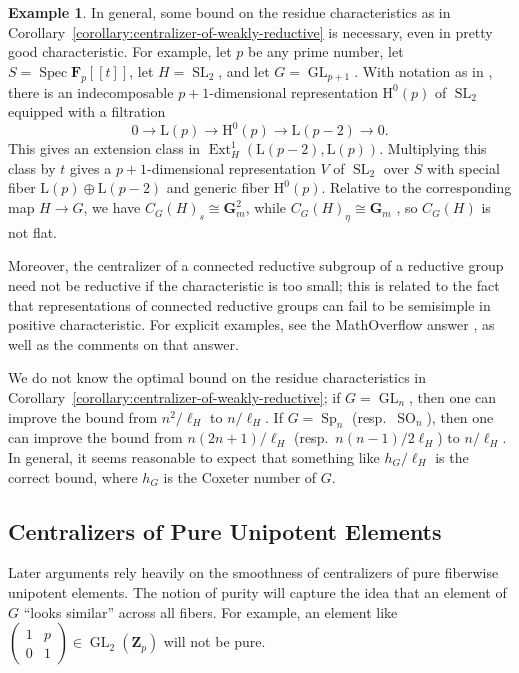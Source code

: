 \documentclass[11pt, letterpaper,english]{amsart}
\theoremstyle{plain}
\theoremstyle{definition}
\newtheorem{example}[lem]{Example}
\numberwithin{equation}{section}
\numberwithin{lem}{section}
\newcommand{\mathfont}{\mathbf}
\newcommand{\Z}{\mathfont Z}
\newcommand{\bF}{\mathfont{F}}
\newcommand{\bG}{\mathfont{G}}
\DeclareMathOperator{\Ext}{Ext}
\newcommand{\ttm}[4]{\begin{pmatrix}
#1 & #2 \\
#3 & #4
\end{pmatrix}}
\DeclareMathOperator{\Spec}{Spec}
\DeclareMathOperator{\GL}{GL}
\DeclareMathOperator{\SL}{SL}
\DeclareMathOperator{\SO}{SO}
\DeclareMathOperator{\Sp}{Sp}
\begin{document}
\begin{example}
In general, some bound on the residue characteristics as in Corollary~\ref{corollary:centralizer-of-weakly-reductive} is necessary, even in pretty good characteristic. For example, let $p$ be any prime number, let $S = \Spec \bF_p[\![t]\!]$, let $H = \SL_2$, and let $G = \GL_{p+1}$. With notation as in \cite[II, Chapter 2]{Jantzen}, there is an indecomposable $p+1$-dimensional representation $\mathrm{H}^0(p)$ of $\SL_2$ equipped with a filtration
\[
0 \to \mathrm{L}(p) \to \mathrm{H}^0(p) \to \mathrm{L}(p-2) \to 0.
\]
This gives an extension class in $\Ext^1_H(\mathrm{L}(p-2), \mathrm{L}(p))$. Multiplying this class by $t$ gives a $p+1$-dimensional representation $V$ of $\SL_2$ over $S$ with special fiber $\mathrm{L}(p) \oplus \mathrm{L}(p-2)$ and generic fiber $\mathrm{H}^0(p)$. Relative to the corresponding map $H \to G$, we have $C_G(H)_s \cong \bG_m^2$, while $C_G(H)_\eta \cong \bG_m$ \cite[Proposition II.2.8]{Jantzen}, so $C_G(H)$ is not flat.

Moreover, the centralizer of a connected reductive subgroup of a reductive group need not be reductive if the characteristic is too small; this is related to the fact that representations of connected reductive groups can fail to be semisimple in positive characteristic. For explicit examples, see the MathOverflow answer \cite{McNinch-Mathoverflow}, as well as the comments on that answer.

We do not know the optimal bound on the residue characteristics in Corollary~\ref{corollary:centralizer-of-weakly-reductive}; if $G = \GL_n$, then one can improve the bound from $n^2/\ell_H$ to $n/\ell_H$. If $G = \Sp_n$ (resp.\ $\SO_n$), then one can improve the bound from $n(2n+1)/\ell_H$ (resp.\ $n(n-1)/2\ell_H$) to $n/\ell_H$. In general, it seems reasonable to expect that something like $h_G/\ell_H$ is the correct bound, where $h_G$ is the Coxeter number of $G$.
\end{example}




\subsection{Centralizers of Pure Unipotent Elements} \label{ss:centralizerunipotent}

Later arguments rely heavily on the smoothness of centralizers of pure fiberwise unipotent elements.  The notion of purity will capture the idea that an element of $G$ ``looks similar'' across all fibers.  For example, an element like $\ttm{1}{p}{0}{1} \in \GL_2(\Z_p)$ will not be pure.
\end{document}
